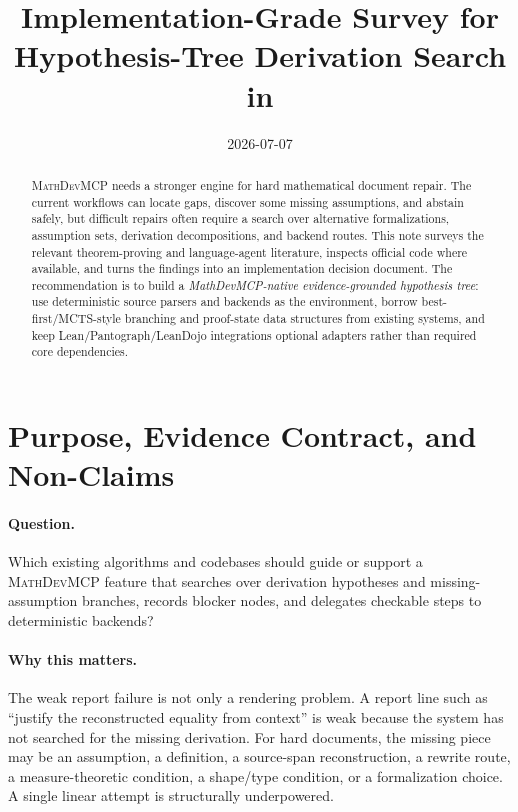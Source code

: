 \documentclass[11pt]{article}
\title{Implementation-Grade Survey for Hypothesis-Tree Derivation Search in \MathDevMCP}
\author{}
\date{2026-07-07}
\newcommand{\MathDevMCP}{\textsc{MathDevMCP}}
\begin{document}
\maketitle

\begin{abstract}
\MathDevMCP{} needs a stronger engine for hard mathematical document repair.
The current workflows can locate gaps, discover some missing assumptions, and
abstain safely, but difficult repairs often require a search over alternative
formalizations, assumption sets, derivation decompositions, and backend routes.
This note surveys the relevant theorem-proving and language-agent literature,
inspects official code where available, and turns the findings into an
implementation decision document. The recommendation is to build a
\emph{MathDevMCP-native evidence-grounded hypothesis tree}: use deterministic
source parsers and backends as the environment, borrow best-first/MCTS-style
branching and proof-state data structures from existing systems, and keep
Lean/Pantograph/LeanDojo integrations optional adapters rather than required
core dependencies.
\end{abstract}

\tableofcontents
\newpage

\section{Purpose, Evidence Contract, and Non-Claims}

\paragraph{Question.}
Which existing algorithms and codebases should guide or support a
\MathDevMCP{} feature that searches over derivation hypotheses and
missing-assumption branches, records blocker nodes, and delegates checkable
steps to deterministic backends?

\paragraph{Why this matters.}
The weak report failure is not only a rendering problem. A report line such as
``justify the reconstructed equality from context'' is weak because the system
has not searched for the missing derivation. For hard documents, the missing
piece may be an assumption, a definition, a source-span reconstruction, a
rewrite route, a measure-theoretic condition, a shape/type condition, or a
formalization choice. A single linear attempt is structurally underpowered.
\end{document}
